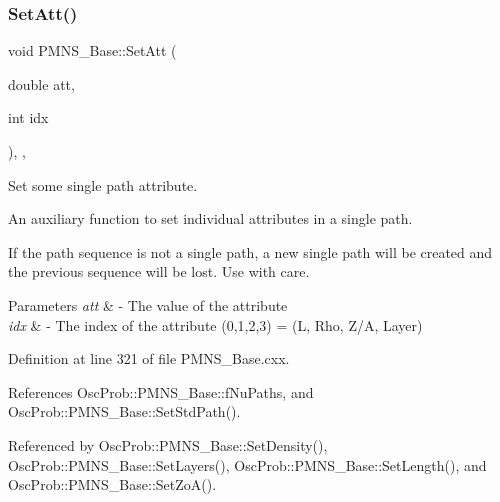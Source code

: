 \subsubsection{\texorpdfstring{Set\+Att()}{SetAtt()}\hspace{0.1cm}{\footnotesize\ttfamily [1/2]}}
{\footnotesize\ttfamily void P\+M\+N\+S\+\_\+\+Base\+::\+Set\+Att (\begin{DoxyParamCaption}\item[{double}]{att,  }\item[{int}]{idx }\end{DoxyParamCaption})\hspace{0.3cm}{\ttfamily [protected]}, {\ttfamily [virtual]}, {\ttfamily [inherited]}}

Set some single path attribute.

An auxiliary function to set individual attributes in a single path.

If the path sequence is not a single path, a new single path will be created and the previous sequence will be lost. Use with care.


\begin{DoxyParams}{Parameters}
{\em att} & -\/ The value of the attribute \\
\hline
{\em idx} & -\/ The index of the attribute (0,1,2,3) = (L, Rho, Z/A, Layer) \\
\hline
\end{DoxyParams}


Definition at line 321 of file P\+M\+N\+S\+\_\+\+Base.\+cxx.



References Osc\+Prob\+::\+P\+M\+N\+S\+\_\+\+Base\+::f\+Nu\+Paths, and Osc\+Prob\+::\+P\+M\+N\+S\+\_\+\+Base\+::\+Set\+Std\+Path().



Referenced by Osc\+Prob\+::\+P\+M\+N\+S\+\_\+\+Base\+::\+Set\+Density(), Osc\+Prob\+::\+P\+M\+N\+S\+\_\+\+Base\+::\+Set\+Layers(), Osc\+Prob\+::\+P\+M\+N\+S\+\_\+\+Base\+::\+Set\+Length(), and Osc\+Prob\+::\+P\+M\+N\+S\+\_\+\+Base\+::\+Set\+Zo\+A().


